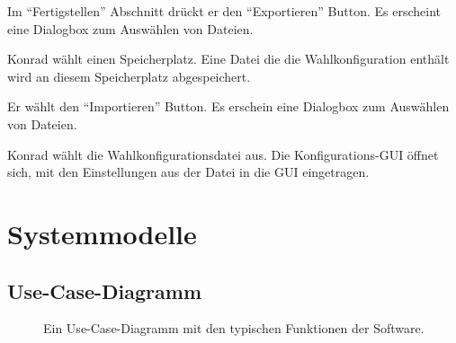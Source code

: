 \documentclass[parskip=full,11pt,twoside]{scrartcl}
\begin{document}

		{Im \enquote{Fertigstellen} Abschnitt drückt er den \enquote{Exportieren} Button.}
		{Es erscheint eine Dialogbox zum Auswählen von Dateien.}

\teststep{}
		{Konrad wählt einen Speicherplatz.}
		{Eine Datei die die Wahlkonfiguration enthält wird an diesem Speicherplatz abgespeichert.}

		{Er wählt den \enquote{Importieren} Button.}
		{Es erschein eine Dialogbox zum Auswählen von Dateien.}
		
\teststep{}
		{Konrad wählt die Wahlkonfigurationsdatei aus.}
		{Die Konfigurations-GUI öffnet sich, mit den Einstellungen aus der Datei in die GUI eingetragen.}

\section{Systemmodelle}

\subsection{Use-Case-Diagramm}
\begin{figure}[H]
	\caption{\label{fig:usecase}
		Ein Use-Case-Diagramm mit den typischen Funktionen der Software.
	}
\end{figure}
\end{document}
